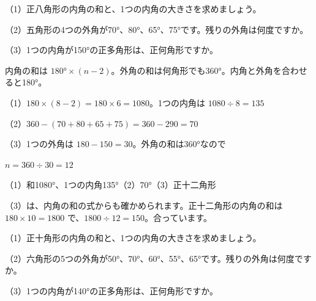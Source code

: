 \begin{reidai}[多角形の内角と外角]
（1）正八角形の内角の和と、1つの内角の大きさを求めましょう。\par
（2）五角形の4つの外角が70°、80°、65°、75°です。残りの外角は何度ですか。\par
（3）1つの内角が150°の正多角形は、正何角形ですか。\par
\kangaekata 内角の和は $180°\times(n-2)$。外角の和は何角形でも360°。内角と外角を合わせると180°。\par
\shiki（1）$180\times(8-2)=180\times6=1080$。1つの内角は $1080\div8=135$\par
\hspace*{2.6\zw}（2）$360-(70+80+65+75)=360-290=70$\par
\hspace*{2.6\zw}（3）1つの外角は $180-150=30$。外角の和は360°なので\par
\hspace*{4.6\zw}$n=360\div30=12$\par
\kotae（1）和1080°、1つの内角135°\quad（2）70°\quad（3）正十二角形
\end{reidai}
（3）は、内角の和の式からも確かめられます。正十二角形の内角の和は $180\times10=1800$ で、$1800\div12=150$。合っています。

\begin{jibun}
（1）正十角形の内角の和と、1つの内角の大きさを求めましょう。\par
（2）六角形の5つの外角が50°、70°、60°、55°、65°です。残りの外角は何度ですか。\par
（3）1つの内角が140°の正多角形は、正何角形ですか。
\end{jibun}

